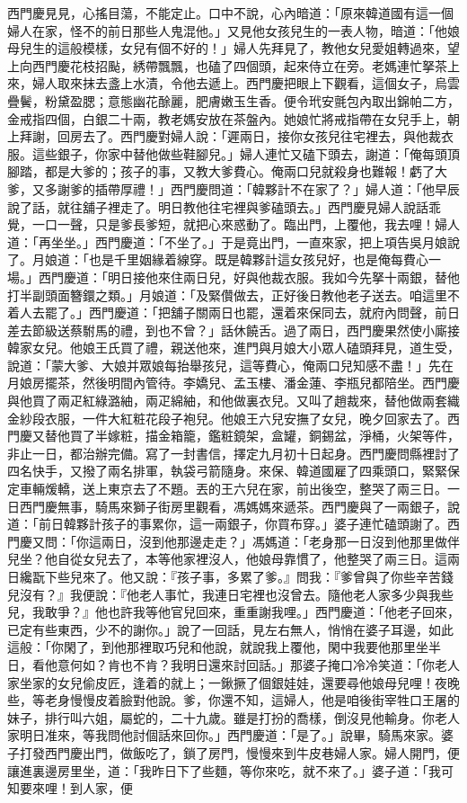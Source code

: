 西門慶見見，心搖目蕩，不能定止。口中不說，心內暗道：「原來韓道國有這一個婦人在家，怪不的前日那些人鬼混他。」又見他女孩兒生的一表人物，暗道：「他娘母兒生的這般模樣，女兒有個不好的！」婦人先拜見了，教他女兒愛姐轉過來，望上向西門慶花枝招颭，綉帶飄飄，也磕了四個頭，起來侍立在旁。老媽連忙拏茶上來，婦人取來抹去盞上水漬，令他去遞上。西門慶把眼上下觀看，這個女子，烏雲疊鬢，粉黛盈腮；意態幽花酴麗，肥膚嫩玉生香。便令玳安氈包內取出錦帕二方，金戒指四個，白銀二十兩，教老媽安放在茶盤內。她娘忙將戒指帶在女兒手上，朝上拜謝，回房去了。西門慶對婦人說：「遲兩日，接你女孩兒往宅裡去，與他裁衣服。這些銀子，你家中替他做些鞋腳兒。」婦人連忙又磕下頭去，謝道：「俺每頭頂腳踏，都是大爹的；孩子的事，又教大爹費心。俺兩口兒就殺身也難報！虧了大爹，又多謝爹的插帶厚禮！」西門慶問道：「韓夥計不在家了？」婦人道：「他早辰說了話，就往舖子裡走了。明日教他往宅裡與爹磕頭去。」西門慶見婦人說話乖覺，一口一聲，只是爹長爹短，就把心來惑動了。臨出門，上覆他，我去哩！婦人道：「再坐坐。」西門慶道：「不坐了。」于是竟出門，一直來家，把上項告吳月娘說了。月娘道：「也是千里姻緣着線穿。既是韓夥計這女孩兒好，也是俺每費心一場。」西門慶道：「明日接他來住兩日兒，好與他裁衣服。我如今先拏十兩銀，替他打半副頭面簪鐶之類。」月娘道：「及緊儹做去，正好後日教他老子送去。咱這里不着人去罷了。」西門慶道：「把舖子關兩日也罷，還着來保同去，就府內問聲，前日差去節級送蔡駙馬的禮，到也不曾？」話休饒舌。過了兩日，西門慶果然使小廝接韓家女兒。他娘王氏買了禮，親送他來，進門與月娘大小眾人磕頭拜見，道生受，說道：「蒙大爹、大娘并眾娘每抬舉孩兒，這等費心，俺兩口兒知感不盡！」先在月娘房擺茶，然後明間內管待。李嬌兒、孟玉樓、潘金蓮、李瓶兒都陪坐。西門慶與他買了兩疋紅綠潞紬，兩疋綿紬，和他做裏衣兒。又叫了趙裁來，替他做兩套織金紗段衣服，一件大紅粧花段子袍兒。他娘王六兒安撫了女兒，晚夕回家去了。西門慶又替他買了半嫁粧，描金箱籠，鑑粧鏡架，盒罐，銅錫盆，淨桶，火架等件，非止一日，都治辦完備。寫了一封書信，擇定九月初十日起身。西門慶問縣裡討了四名快手，又撥了兩名排軍，執袋弓箭隨身。來保、韓道國雇了四乘頭口，緊緊保定車輛煖轎，送上東京去了不題。丟的王六兒在家，前出後空，整哭了兩三日。一日西門慶無事，騎馬來獅子街房里觀看，馮媽媽來遞茶。西門慶與了一兩銀子，說道：「前日韓夥計孩子的事累你，這一兩銀子，你買布穿。」婆子連忙磕頭謝了。西門慶又問：「你這兩日，沒到他那邊走走？」馮媽道：「老身那一日沒到他那里做伴兒坐？他自從女兒去了，本等他家裡沒人，他娘母靠慣了，他整哭了兩三日。這兩日纔翫下些兒來了。他又說：『孩子事，多累了爹。』問我：『爹曾與了你些辛苦錢兒沒有？』我便說：『他老人事忙，我連日宅裡也沒曾去。隨他老人家多少與我些兒，我敢爭？』他也許我等他官兒回來，重重謝我哩。」西門慶道：「他老子回來，已定有些東西，少不的謝你。」說了一回話，見左右無人，悄悄在婆子耳邊，如此這般：「你閑了，到他那裡取巧兒和他說，就說我上覆他，閑中我要他那里坐半日，看他意何如？肯也不肯？我明日還來討回話。」那婆子掩口冷冷笑道：「你老人家坐家的女兒偷皮匠，逢着的就上；一鍬撅了個銀娃娃，還要尋他娘母兒哩！夜晚些，等老身慢慢皮着臉對他說。爹，你還不知，這婦人，他是咱後街宰牲口王屠的妹子，排行叫六姐，屬蛇的，二十九歲。雖是打扮的喬樣，倒沒見他輸身。你老人家明日准來，等我問他討個話來回你。」西門慶道：「是了。」說畢，騎馬來家。婆子打發西門慶出門，做飯吃了，鎖了房門，慢慢來到牛皮巷婦人家。婦人開門，便讓進裏邊房里坐，道：「我昨日下了些麵，等你來吃，就不來了。」婆子道：「我可知要來哩！到人家，便